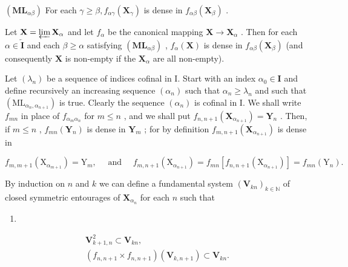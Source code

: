 \((\mathbf{ML}_{\alpha \beta})\) For each \(\gamma \geqslant \beta, f_{\alpha \gamma}(\mathbf{X}_{\gamma})\) is dense in \(f_{\alpha \beta}(\mathbf{X}_{\beta})\) .

Let \(\mathbf{X} = \varprojlim \mathbf{X}_{\alpha}\) and let \(f_{\alpha}\) be the canonical mapping \(\mathbf{X} \to \mathbf{X}_{\alpha}\) . Then for each \(\alpha \in \overleftarrow{\mathbf{I}}\) and each \(\beta \geqslant \alpha\) satisfying \((\mathbf{ML}_{\alpha\beta})\) , \(f_{\alpha}(\mathbf{X})\) is dense in \(f_{\alpha\beta}(\mathbf{X}_{\beta})\) (and consequently \(\mathbf{X}\) is non-empty if the \(\mathbf{X}_{\alpha}\) are all non-empty).

Let \((\lambda_{n})\) be a sequence of indices cofinal in I. Start with an index \(\alpha_0 \in \mathbf{I}\) and define recursively an increasing sequence \((\alpha_{n})\) such that \(\alpha_{n} \geqslant \lambda_{n}\) and such that \((\mathrm{ML}_{\alpha_{n}, \alpha_{n+1}})\) is true. Clearly the sequence \((\alpha_{n})\) is cofinal in I. We shall write \(f_{mn}\) in place of \(f_{\alpha_m\alpha_n}\) for \(m \leqslant n\) , and we shall put \(f_{n,n+1}(\mathbf{X}_{\alpha_{n+1}}) = \mathbf{Y}_n\) . Then, if \(m \leqslant n\) , \(f_{mn}(\mathbf{Y}_n)\) is dense in \(\mathbf{Y}_m\) ; for by definition \(f_{m,n+1}(\mathbf{X}_{\alpha_{n+1}})\) is dense in

\[
f _ {m, m + 1} \left(\mathrm{X} _ {\alpha_ {m + 1}}\right) = \mathrm{Y} _ {m}, \quad \text { and } \quad f _ {m, n + 1} \left(\mathrm{X} _ {\alpha_ {n + 1}}\right) = f _ {m n} \left[ f _ {n, n + 1} \left(\mathrm{X} _ {\alpha_ {n + 1}}\right) \right] = f _ {m n} \left(\mathrm{Y} _ {n}\right).
\]

By induction on \(n\) and \(k\) we can define a fundamental system \((\mathbf{V}_{kn})_{k\in \mathbb{N}}\) of closed symmetric entourages of \(\mathbf{X}_{\alpha_n}\) for each \(n\) such that

\begin{enumerate}
\def\labelenumi{(\arabic{enumi})}
\setcounter{enumi}{1}
\tightlist
\item
\end{enumerate}

\[
\begin{array}{c} \mathbf {V} _ {k + 1, n} ^ {2} \subset \mathbf {V} _ {k n}, \\ (f _ {n, n + 1} \times f _ {n, n + 1}) (\mathbf {V} _ {k, n + 1}) \subset \mathbf {V} _ {k n}. \end{array}\tag{3}
\]

